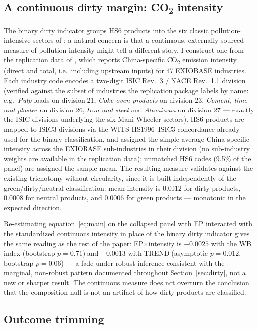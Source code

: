 \documentclass[12pt]{article}
\begin{document}
\subsection{A continuous dirty margin: CO\textsubscript{2} intensity}

The binary dirty indicator groups HS6 products into the six classic
pollution-intensive sectors of \citet{mani1998}; a natural concern is that a
continuous, externally sourced measure of pollution intensity might tell a different
story. I construct one from the replication data of \citet{shapiro2021}, which
reports China-specific CO\textsubscript{2} emission intensity (direct and total,
i.e.\ including upstream inputs) for 47 EXIOBASE industries. Each industry code
encodes a two-digit ISIC Rev.\ 3 / NACE Rev.\ 1.1 division (verified against the
subset of industries the replication package labels by name: e.g.\ \emph{Pulp}
loads on division 21, \emph{Coke oven products} on division 23, \emph{Cement, lime
and plaster} on division 26, \emph{Iron and steel} and \emph{Aluminum} on division
27 --- exactly the ISIC divisions underlying the six Mani-Wheeler sectors). HS6
products are mapped to ISIC3 divisions via the WITS HS1996--ISIC3 concordance
already used for the binary classification, and assigned the simple average
China-specific intensity across the EXIOBASE sub-industries in their division (no
sub-industry weights are available in the replication data); unmatched HS6 codes
(9.5\% of the panel) are assigned the sample mean. The resulting measure validates
against the existing trichotomy without circularity, since it is built independently
of the green/dirty/neutral classification: mean intensity is $0.0012$ for dirty
products, $0.0008$ for neutral products, and $0.0006$ for green products ---
monotonic in the expected direction.

Re-estimating equation~\eqref{eq:main} on the collapsed panel with EP interacted with
the standardized continuous intensity in place of the binary dirty indicator gives
the same reading as the rest of the paper: EP$\times$intensity is $-0.0025$ with the
WB index (bootstrap $p=0.71$) and $-0.0013$ with TREND (asymptotic $p=0.012$,
bootstrap $p=0.06$) --- a fade under robust inference consistent with the marginal,
non-robust pattern documented throughout Section~\ref{sec:dirty}, not a new or
sharper result. The continuous measure does not overturn the conclusion that the
composition null is not an artifact of how dirty products are classified.

\subsection{Outcome trimming}
\end{document}
